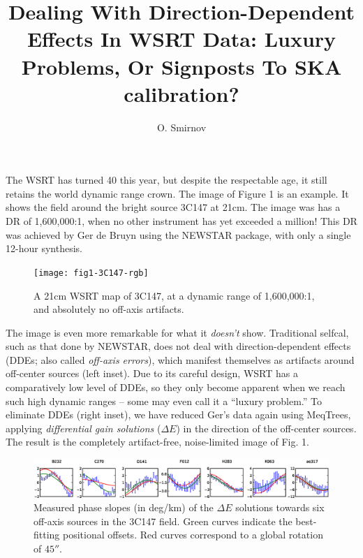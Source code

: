 \documentclass[]{article}
\begin{document}
\title{Dealing With Direction-Dependent Effects In WSRT Data: Luxury Problems, Or Signposts To SKA calibration?}

\author{O. Smirnov}

\maketitle

The WSRT has turned 40 this year, but despite the respectable age, it still retains the world dynamic range crown. The image of Figure 1 is an example. It shows the field around the bright source 3C147 at 21cm. The image was has a DR of 1,600,000:1, when no other instrument has yet exceeded a million! This DR was achieved by Ger de Bruyn using the NEWSTAR package, with only a single 12-hour synthesis.

\begin{figure}
\texttt{[image: fig1-3C147-rgb]}
\caption{A 21cm WSRT map of 3C147, at a dynamic range of 1,600,000:1, and absolutely no off-axis artifacts.}
\end{figure}
 
The image is even more remarkable for what it {\em doesn't} show. Traditional selfcal, such as that done by NEWSTAR, does not deal with direction-dependent effects (DDEs; also called {\em off-axis errors}), which manifest themselves as artifacts around off-center sources (left inset). Due to its careful design, WSRT has a comparatively low level of DDEs, so they only become apparent when we reach such high dynamic ranges -- some may even call it a ``luxury problem.'' To eliminate DDEs (right inset), we have reduced Ger's data again using MeqTrees, applying {\em differential gain solutions} ($\Delta E$) in the direction of the off-center sources. The result is the completely artifact-free, noise-limited image of Fig. 1.

\begin{figure}
\includegraphics[width=\textwidth]{o2003_dEphase_array_slopes}
\caption{Measured phase slopes (in deg/km) of the $\Delta E$ solutions towards six off-axis sources in the 3C147 field. Green curves indicate the best-fitting positional offsets. Red curves correspond to a global rotation of $45''$. }
\end{figure}
\end{document}
